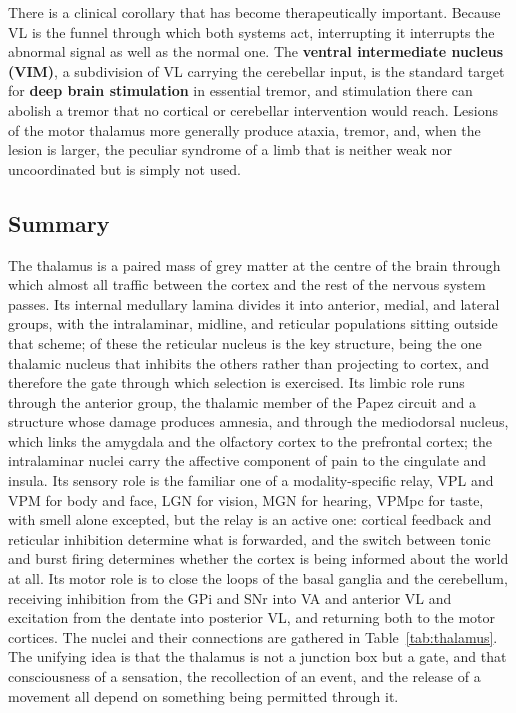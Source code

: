\documentclass[11pt]{article}
\begin{document}
There is a clinical corollary that has become therapeutically important. Because VL is the funnel through which both systems act, interrupting it interrupts the abnormal signal as well as the normal one. The \textbf{ventral intermediate nucleus (VIM)}, a subdivision of VL carrying the cerebellar input, is the standard target for \textbf{deep brain stimulation} in essential tremor, and stimulation there can abolish a tremor that no cortical or cerebellar intervention would reach. Lesions of the motor thalamus more generally produce ataxia, tremor, and, when the lesion is larger, the peculiar syndrome of a limb that is neither weak nor uncoordinated but is simply not used.

\subsection{Summary}

The thalamus is a paired mass of grey matter at the centre of the brain through which almost all traffic between the cortex and the rest of the nervous system passes. Its internal medullary lamina divides it into anterior, medial, and lateral groups, with the intralaminar, midline, and reticular populations sitting outside that scheme; of these the reticular nucleus is the key structure, being the one thalamic nucleus that inhibits the others rather than projecting to cortex, and therefore the gate through which selection is exercised. Its limbic role runs through the anterior group, the thalamic member of the Papez circuit and a structure whose damage produces amnesia, and through the mediodorsal nucleus, which links the amygdala and the olfactory cortex to the prefrontal cortex; the intralaminar nuclei carry the affective component of pain to the cingulate and insula. Its sensory role is the familiar one of a modality-specific relay, VPL and VPM for body and face, LGN for vision, MGN for hearing, VPMpc for taste, with smell alone excepted, but the relay is an active one: cortical feedback and reticular inhibition determine what is forwarded, and the switch between tonic and burst firing determines whether the cortex is being informed about the world at all. Its motor role is to close the loops of the basal ganglia and the cerebellum, receiving inhibition from the GPi and SNr into VA and anterior VL and excitation from the dentate into posterior VL, and returning both to the motor cortices. The nuclei and their connections are gathered in Table~\ref{tab:thalamus}. The unifying idea is that the thalamus is not a junction box but a gate, and that consciousness of a sensation, the recollection of an event, and the release of a movement all depend on something being permitted through it.
\end{document}
